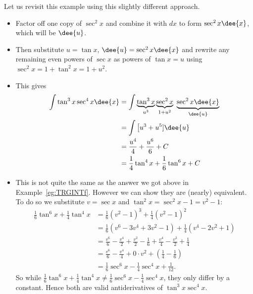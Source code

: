 \begin{eg}\label{eg:TRGINTfredux}
\soln Let us revisit this example using this slightly different approach.
\begin{itemize}
 \item Factor off one copy of $\sec^2 x$ and combine it with $dx$
to form $\sec^2 x\dee{x}$, which will be $\dee{u}$.
\item Then substitute $u=\tan x$, $\dee{u}=\sec^2 x\dee{x}$ and rewrite any remaining even
powers of $\sec x$ as powers of $\tan x=u$ using $\sec^2x = 1+\tan^2 x=1+u^2$.
\item This gives
\begin{align*}
\int \tan^3x \sec^4 x\dee{x}
&= \int \underbrace{\tan^3x}_{u^3} \underbrace{\sec^2 x}_{1+u^2}\
        \underbrace{\sec^2 x\dee{x}}_{\dee{u}}  \\
&= \int \big[u^3+u^5]\dee{u} \\
&=\frac{u^4}{4}+ \frac{u^6}{6} + C \\
&=\frac{1}{4}\tan^4 x+\frac{1}{6}\tan^6 x + C
\end{align*}
\item This is not quite the same as the answer we got above in
Example~\ref{eg:TRGINTf}. However we can show they are (nearly) equivalent. To
do so we substitute $v=\sec x$ and $\tan^2x=\sec^2x-1 = v^2-1$:
\begin{align*}
  \frac{1}{6}\tan^6x + \frac{1}{4}\tan^4x
  &= \frac{1}{6} (v^2-1)^3 + \frac{1}{4}(v^2-1)^2 \\
  &= \frac{1}{6} (v^6-3v^4+3v^2-1) + \frac{1}{4} (v^4-2v^2+1) \\
  &= \frac{v^6}{6} - \frac{v^4}{2} + \frac{v^2}{2} - \frac{1}{6} + \frac{v^4}{4} -
\frac{v^2}{2} + \frac{1}{4} \\
  &= \frac{v^6}{6} -\frac{v^4}{4} + 0 \cdot v^2 + \left(\frac{1}{4}-\frac{1}{6}\right)\\
  &= \frac{1}{6}\sec^6x - \frac{1}{4}\sec^4x + \frac{1}{12}.
\end{align*}
So while $\frac{1}{6}\tan^6x + \frac{1}{4}\tan^4x \neq \frac{1}{6}\sec^6x -
\frac{1}{4}\sec^4x$, they only differ by a constant. Hence both are valid antiderivatives
of $\tan^3 x\sec^4x$.
\end{itemize}

\end{eg}
